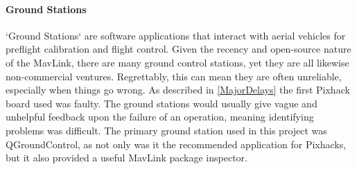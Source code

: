 \documentclass{article}
\begin{document}
\paragraph{Ground Stations}
`Ground Stations` are software applications that interact with aerial vehicles for preflight calibration and flight control. Given the recency and open-source nature of the MavLink, there are many ground control stations, yet they are all likewise non-commercial ventures. Regrettably, this can mean they are often unreliable, especially when things go wrong. As described in \ref{MajorDelays} the first Pixhack board used was faulty. The ground stations would usually give vague and unhelpful feedback upon the failure of an operation, meaning identifying problems was difficult. The primary ground station used in this project was QGroundControl\cite{qGroundControl}, as not only was it the recommended application for Pixhacks, but it also provided a useful MavLink package inspector. 
\end{document}
